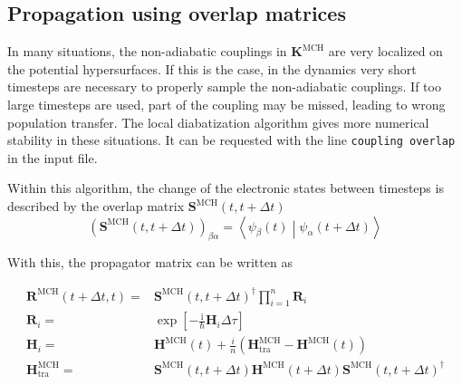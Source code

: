 \documentclass[a4paper,11pt,DIV=15,openany,twoside=false]{scrbook}
\newcommand{\tthdump}[1]{#1}
\newcommand{\ttt}[1]{\texttt{#1}}
\newcommand{\I}{\ensuremath{\mathrm{i}}}
\renewcommand{\vec}[1]{\ensuremath{\mathbf{#1}}}
\begin{document}
\subsection{Propagation using overlap matrices}

In many situations, the non-adiabatic couplings in $\vec{K}^{\text{MCH}}$ are very localized on the potential hypersurfaces. If this is the case, in the dynamics very short timesteps are necessary to properly sample the non-adiabatic couplings. If too large timesteps are used, part of the coupling may be missed, leading to wrong population transfer. The local diabatization algorithm gives more numerical stability in these situations. It can be requested with the line \ttt{coupling overlap} in the input file.

Within this algorithm, the change of the electronic states between timesteps is described by the overlap matrix $\vec{S}^{\text{MCH}}(t,t+\Delta t)$
\begin{equation}
  \left(\vec{S}^{\text{MCH}}(t,t+\Delta t)\right)_{\beta\alpha}=
  \left\langle
    \psi_\beta(t)
  \middle|
    \psi_\alpha(t+\Delta t)
  \right\rangle
\end{equation}

With this, the propagator matrix can be written as
\tthdump{
  \begin{align}
    \vec{R}^{\text{MCH}}(t+\Delta t,t)=&
    \vec{S}^{\text{MCH}}(t,t+\Delta t)^\dagger\prod\limits_{i=1}^{n}
    \vec{R}_i\\
    \vec{R}_i=&
    \exp\left[
        -\frac{\I}{\hbar}\vec{H}_i\Delta\tau
    \right]\\
    \vec{H}_i=&
    \vec{H}^{\text{MCH}}(t) + \frac{i}{n}
    \left(
      \vec{H}^{\text{MCH}}_{\text{tra}}
      -\vec{H}^{\text{MCH}}(t)
    \right)\label{eq:ham_propl}\\
    \vec{H}^{\text{MCH}}_{\text{tra}}=&
      \vec{S}^{\text{MCH}}(t,t+\Delta t)
      \vec{H}^{\text{MCH}}(t+\Delta t)
      \vec{S}^{\text{MCH}}(t,t+\Delta t)^\dagger
  \end{align}
}
\end{document}
